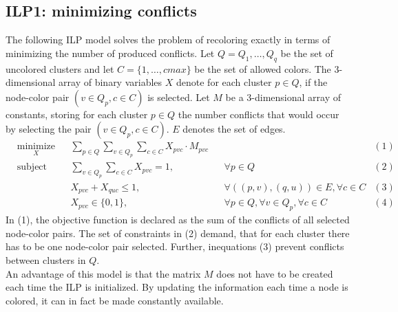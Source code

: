 \subsection{ILP1: minimizing conflicts}
The following ILP model solves the problem of recoloring exactly in terms of minimizing the number of produced conflicts. Let $Q = {Q_1,\ldots,Q_q}$ be the set of uncolored clusters and let $C=\{1,\ldots,cmax\}$ be the set of allowed colors. The 3-dimensional array of binary variables $X$ denote for each cluster $p \in Q$, if the node-color pair $(v \in Q_p, c \in C)$ is selected. Let $M$ be a 3-dimensional array of constants, storing for each cluster $p \in Q$ the number conflicts that would occur by selecting the pair $(v \in Q_p, c \in C)$. $E$ denotes the set of edges.
\begin{equation*}
\begin{aligned}
& \underset{X}{\text{minimize}} && \sum_{p \in Q}\sum_{v \in Q_p}\sum_{c \in C} X_{pvc} \cdot M_{pvc}                    &&&(1)\\
& \text{subject to} && \sum_{v \in Q_p}\sum_{c \in C} X_{pvc}=1, && \forall p \in Q    &(2)\\
&&& X_{pvc}+X_{quc} \leq 1, && \forall ((p,v),(q,u)) \in E, \forall c \in C     &(3)\\
&&& X_{pvc} \in \{0,1\}, && \forall p \in Q, \forall v \in Q_p, \forall c \in C         &(4)
\end{aligned}
\end{equation*}
In (1), the objective function is declared as the sum of the conflicts of all selected node-color pairs. The set of constraints in (2) demand, that for each cluster there has to be one node-color pair selected. Further, inequations (3) prevent conflicts between clusters in $Q$.\\
An advantage of this model is that the matrix $M$ does not have to be created each time the ILP is initialized. By updating the information each time a node is colored, it can in fact be made constantly available.


